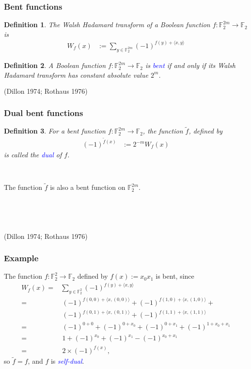 \documentclass[pdf,sprung,slideColor,nocolorBG]{beamer}
\newenvironment{colortheme}[1]{
\def\ProvidesPackageRCS $##1${\relax}
\renewcommand{\ProcessOptions}{\relax}
\makeatletter

\makeatother
}{}
\newcommand{\slidecite}[1]{\tiny{(#1)}\normalsize{}}
\newcommand{\mb}[1]{\mathbb{#1}}
\newcommand{\Emph}[1]{\emph{\textcolor{blue}{#1}}}
\newcommand{\To}{\rightarrow}
\newcommand{\dual}[1]{\widetilde{#1}}
\newcommand{\F}{\mb{F}}
\newtheorem{Def}{Definition}
\begin{document}
\begin{colortheme}{seagull}

\begin{frame}
\frametitle{Bent functions}
\begin{Def}
\label{def-Walsh-Hadamard-transform}
The Walsh Hadamard transform of
a Boolean function $f : \F_2^{2m} \To \F_2$ is
\begin{align*}
W_f(x)
&:=
\sum_{y \in \F_2^{2m}} (-1)^{f(y) + \langle x, y \rangle}
\end{align*}
\end{Def}

\begin{Def}
\label{def-Bent-function}
A Boolean function $f : \F_2^{2m} \To \F_2$ is \Emph{bent}
if and only if its Walsh Hada\-mard transform has constant absolute value $2^{m}$.
\end{Def}
\slidecite{Dillon 1974; Rothaus 1976}
\end{frame}
\begin{frame}
\frametitle{Dual bent functions}

\begin{Def}
\label{def-dual-Bent-function}
For a bent function  $f : \F_2^{2m} \To \F_2$, the function $\dual{f}$, defined by
\begin{align*}
(-1)^{\dual{f}(x)} &:= 2^{-m} W_f(x)
\end{align*}
is called the \Emph{dual} of $f$.
\end{Def}

~

The function $\dual{f}$ is also a bent function on $\F_2^{2m}$.

~

~

\slidecite{Dillon 1974; Rothaus 1976}
\end{frame}

\begin{frame}
\frametitle{Example}

The function  $f : \F_2^2 \To \F_2$  defined by $f(x) := x_0 x_1$
is bent, since
\begin{align*}
W_f(x)
=&
\sum_{y \in \F_2^2} (-1)^{f(y) + \langle x, y \rangle}
\\
=&\ (-1)^{f(0,0) + \langle x, (0,0) \rangle}
 + (-1)^{f(1,0) + \langle x, (1,0) \rangle} +
\\
\phantom{=}&\ (-1)^{f(0,1) + \langle x, (0,1) \rangle}
 + (-1)^{f(1,1) + \langle x, (1,1) \rangle}
\\
=&\ (-1)^{0 + 0} + (-1)^{0 + x_0} + (-1)^{0 + x_1} + (-1)^{1 + x_0 + x_1}
\\
=&\ 1 + (-1)^{x_0} + (-1)^{x_1} - (-1)^{x_0 + x_1}
\\
=&\ 2 \times (-1)^{f(x)},
\end{align*}
so $\dual{f} = f$, and $f$ is \Emph{self-dual}.
%
\end{frame}


\end{colortheme}
\end{document}
